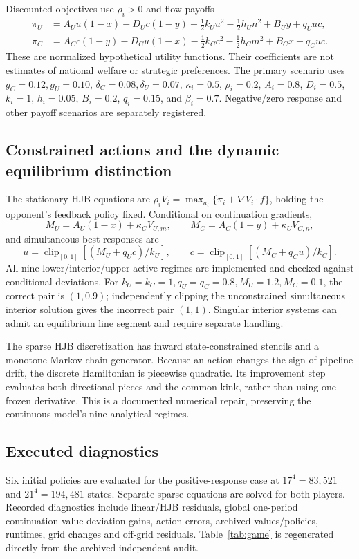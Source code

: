 \documentclass[11pt]{article}
\newcommand{\clip}{\operatorname{clip}_{[0,1]}}
\begin{document}
Discounted objectives use $\rho_i>0$ and flow payoffs
\begin{align}
 \pi_U&=A_Uu(1-x)-D_Uc(1-y)-\tfrac12k_Uu^2-\tfrac12h_Un^2+B_Uy+q_Uuc,\\
 \pi_C&=A_Cc(1-y)-D_Cu(1-x)-\tfrac12k_Cc^2-\tfrac12h_Cm^2+B_Cx+q_Cuc.
\end{align}
These are normalized hypothetical utility functions. Their coefficients are not estimates of national welfare or strategic preferences. The primary scenario uses $g_C=0.12,g_U=0.10$, $\delta_C=0.08,\delta_U=0.07$, $\kappa_i=0.5$, $\rho_i=0.2$, $A_i=0.8$, $D_i=0.5$, $k_i=1$, $h_i=0.05$, $B_i=0.2$, $q_i=0.15$, and $\beta_i=0.7$. Negative/zero response and other payoff scenarios are separately registered.

\subsection{Constrained actions and the dynamic equilibrium distinction}
The stationary HJB equations are $\rho_iV_i=\max_{a_i}\{\pi_i+\nabla V_i\cdot f\}$, holding the opponent's feedback policy fixed. Conditional on continuation gradients,
\begin{equation}
 M_U=A_U(1-x)+\kappa_CV_{U,m},\qquad M_C=A_C(1-y)+\kappa_UV_{C,n},
\end{equation}
and simultaneous best responses are
\begin{equation}
 u=\clip[(M_U+q_Uc)/k_U],\qquad c=\clip[(M_C+q_Cu)/k_C].
\end{equation}
All nine lower/interior/upper active regimes are implemented and checked against conditional deviations. For $k_U=k_C=1,q_U=q_C=0.8,M_U=1.2,M_C=0.1$, the correct pair is $(1,0.9)$; independently clipping the unconstrained simultaneous interior solution gives the incorrect pair $(1,1)$. Singular interior systems can admit an equilibrium line segment and require separate handling.

The sparse HJB discretization has inward state-constrained stencils and a monotone Markov-chain generator. Because an action changes the sign of pipeline drift, the discrete Hamiltonian is piecewise quadratic. Its improvement step evaluates both directional pieces and the common kink, rather than using one frozen derivative. This is a documented numerical repair, preserving the continuous model's nine analytical regimes.

\subsection{Executed diagnostics}
Six initial policies are evaluated for the positive-response case at $17^4=83{,}521$ and $21^4=194{,}481$ states. Separate sparse equations are solved for both players. Recorded diagnostics include linear/HJB residuals, global one-period continuation-value deviation gains, action errors, archived values/policies, runtimes, grid changes and off-grid residuals. Table~\ref{tab:game} is regenerated directly from the archived independent audit.
\end{document}
